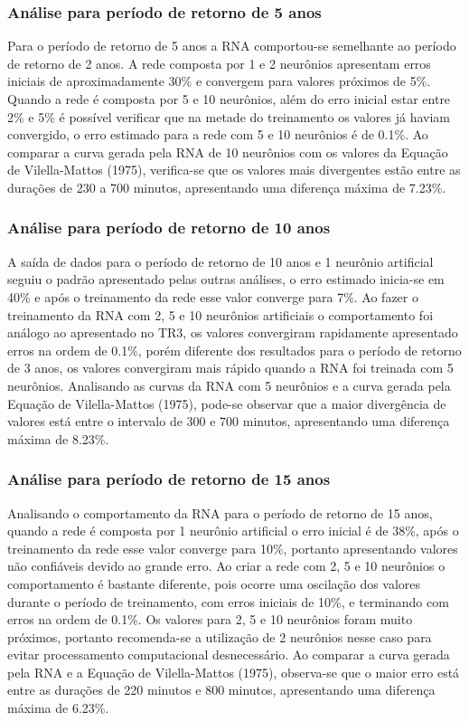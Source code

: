 \subsubsection{Análise para período de retorno de 5 anos}
Para o período de retorno de 5 anos a RNA comportou-se semelhante ao período de retorno de 2 anos. A rede composta por 1 e 2 neurônios apresentam erros iniciais de aproximadamente 30\% e convergem para valores próximos de 5\%. Quando a rede é composta por 5 e 10 neurônios, além do erro inicial estar entre 2\% e 5\% é possível verificar que na metade do treinamento os valores já haviam convergido, o erro estimado para a rede com 5 e 10 neurônios é de 0.1\%. Ao comparar a curva gerada pela RNA de 10 neurônios com os valores da Equação de Vilella-Mattos (1975), verifica-se que os valores mais divergentes estão entre as durações de 230 a 700 minutos, apresentando uma diferença máxima de 7.23\%.

\subsubsection{Análise para período de retorno de 10 anos}
A saída de dados para o período de retorno de 10 anos e 1 neurônio artificial seguiu o padrão apresentado pelas outras análises, o erro estimado inicia-se em 40\% e após o treinamento da rede esse valor converge para 7\%. Ao fazer o treinamento da RNA com 2, 5 e 10 neurônios artificiais o comportamento foi análogo ao apresentado no TR3, os valores convergiram rapidamente apresentado erros na ordem de 0.1\%, porém diferente dos resultados para o período de retorno de 3 anos, os valores convergiram mais rápido quando a RNA foi treinada com 5 neurônios. Analisando as curvas da RNA com 5 neurônios e a curva gerada pela Equação de Vilella-Mattos (1975), pode-se observar que a maior divergência de valores está entre o intervalo de 300 e 700 minutos, apresentando uma diferença máxima de 8.23\%.

\subsubsection{Análise para período de retorno de 15 anos}
Analisando o comportamento da RNA para o período de retorno de 15 anos, quando a rede é composta por 1 neurônio artificial o erro inicial é de 38\%, após o treinamento da rede esse valor converge para 10\%, portanto apresentando valores não confiáveis devido ao grande erro. Ao criar a rede com 2, 5 e 10 neurônios o comportamento é bastante diferente, pois ocorre uma oscilação dos valores durante o período de treinamento, com erros iniciais de 10\%, e terminando com erros na ordem de 0.1\%. Os valores para 2, 5 e 10 neurônios foram muito próximos, portanto recomenda-se a utilização de 2 neurônios nesse caso para evitar processamento computacional desnecessário. Ao comparar a curva gerada pela RNA e a Equação de Vilella-Mattos (1975), observa-se que o maior erro está entre as durações de 220 minutos e 800 minutos, apresentando uma diferença máxima de 6.23\%.

